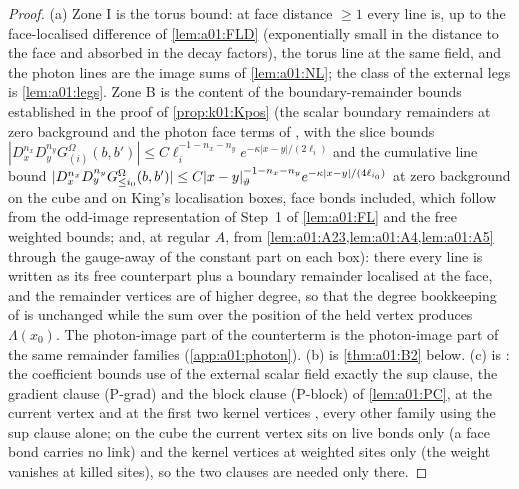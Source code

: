 \begin{proof}
(a) Zone I is the torus bound: at face distance $\ge1$ every line is, up to the face-localised difference of \cref{lem:a01:FLD} (exponentially small in the distance to the face and absorbed in the decay factors), the torus line at the same field, and the photon lines are the image sums of \cref{lem:a01:NL}; the class of the external legs is \cref{lem:a01:legs}. Zone B is the content of the boundary-remainder bounds established in the proof of \cref{prop:k01:Kpos} (the scalar boundary remainders at zero background and the photon face terms of \cite[pp.~331--332]{K2}, with the slice bounds $|D^{n_x}_xD^{n_y}_yG^\Omega_{(i)}(b,b')|\le C\ell_i^{-1-n_x-n_y}e^{-\kappa|x-y|/(2\ell_i)}$ and the cumulative line bound $|D^{n_x}_xD^{n_y}_yG^\Omega_{\le i_0}(b,b')|\le C|x-y|_{\vartheta}^{-1-n_x-n_y}e^{-\kappa|x-y|/(4\ell_{i_0})}$ at zero background on the cube and on King's localisation boxes, face bonds included, which follow from the odd-image representation of Step~1 of \cref{lem:a01:FL} and the free weighted bounds; and, at regular $A$, from \cref{lem:a01:A23,lem:a01:A4,lem:a01:A5} through the gauge-away of the constant part on each box): there every line is written as its free counterpart plus a boundary remainder localised at the face, and the remainder vertices are of higher degree, so that the degree bookkeeping of \cite[Sect.~2]{Ba3} is unchanged while the sum over the position of the held vertex produces $\Lambda(x_0)$. The photon-image part of the counterterm is the photon-image part of the same remainder families (\cref{app:a01:photon}). (b) is \cref{thm:a01:B2} below. (c) is \cite[p.~421]{Ba3}: the coefficient bounds use of the external scalar field exactly the sup clause, the gradient clause (P-grad) and the block clause (P-block) of \cref{lem:a01:PC}, at the current vertex \cite[(1.8)]{Ba3} and at the first two kernel vertices \cite[(1.18)]{Ba3}, every other family using the sup clause alone; on the cube the current vertex sits on live bonds only (a face bond carries no link) and the kernel vertices at weighted sites only (the weight vanishes at killed sites), so the two clauses are needed only there.
\end{proof}

